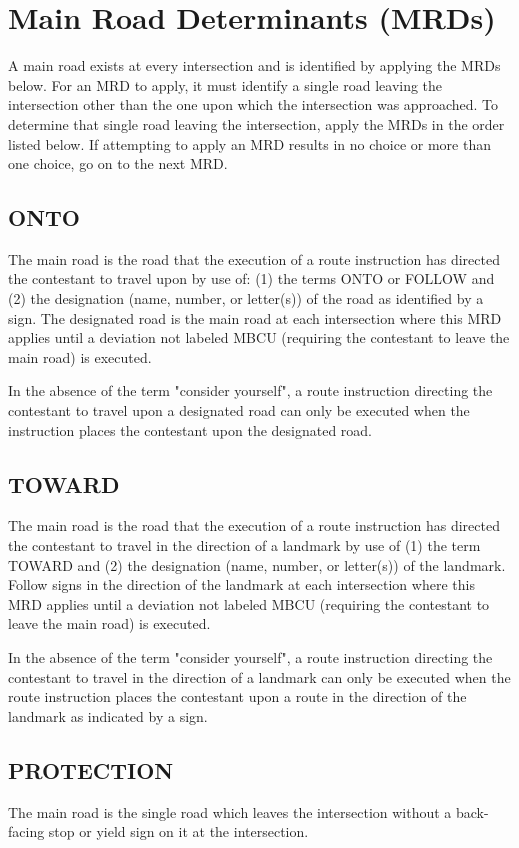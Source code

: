 \section{Main Road Determinants (MRDs)}
\label{sec:mrd} A main road exists at every intersection and is identified by applying the MRDs below.  For an MRD to apply, it must identify a single road leaving the intersection other than the one upon which the intersection was approached.  To determine that single road leaving the intersection, apply the MRDs in the order listed below.  If attempting to apply an MRD results in no choice or more than one choice, go on to the next MRD.

\subsection{ONTO}
\label{sec:follow} The main road is the road that the execution of a route instruction has directed the contestant to travel upon by use of: (1) the terms ONTO or FOLLOW and (2) the designation (name, number, or letter(s)) of the road as identified by a sign.  The designated road is the main road at each intersection where this MRD applies until a deviation not labeled MBCU (requiring the contestant to leave the main road) is executed.

In the absence of the term "consider yourself", a route instruction directing the contestant to travel upon a designated road can only be executed when the instruction places the contestant upon the designated road.

\subsection{TOWARD}
The main road is the road that the execution of a route instruction has directed the contestant to travel in the direction of a landmark by use of (1) the term TOWARD and (2) the designation (name, number, or letter(s)) of the landmark.  Follow signs in the direction of the landmark at each intersection where this MRD applies until a deviation not labeled MBCU (requiring the contestant to leave the main road) is executed.

In the absence of the term "consider yourself", a route instruction directing the contestant to travel in the direction of a landmark can only be executed when the route instruction places the contestant upon a route in the direction of the landmark as indicated by a sign.

\subsection{PROTECTION}
The main road is the single road which leaves the intersection without a back-facing stop or yield sign on it at the intersection.

